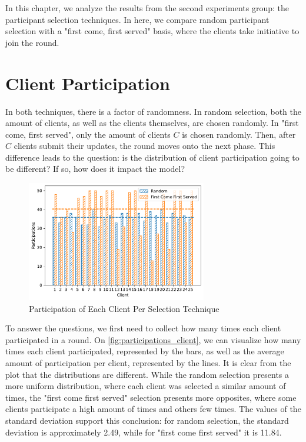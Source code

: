 In this chapter, we analyze the results from the second experiments group: the participant selection techniques. In here, we compare random participant selection with a "first come, first served" basis, where the clients take initiative to join the round.

\section{Client Participation}

In both techniques, there is a factor of randomness. In random selection, both the amount of clients, as well as the clients themselves, are chosen randomly. In "first come, first served", only the amount of clients $C$ is chosen randomly. Then, after $C$ clients submit their updates, the round moves onto the next phase. This difference leads to the question: is the distribution of client participation going to be different? If so, how does it impact the model?

\begin{figure}[!ht]
    \centering
    \centering
    \includegraphics[width=0.7\textwidth]{graphics/selection/clients.pdf}
    \caption{Participation of Each Client Per Selection Technique}
    \label{fig:participations_client}
\end{figure}

To answer the questions, we first need to collect how many times each client participated in a round. On \autoref{fig:participations_client}, we can visualize how many times each client participated, represented by the bars, as well as the average amount of participation per client, represented by the lines. It is clear from the plot that the distributions are different. While the random selection presents a more uniform distribution, where each client was selected a similar amount of times, the "first come first served" selection presents more opposites, where some clients participate a high amount of times and others few times. The values of the standard deviation support this conclusion: for random selection, the standard deviation is approximately 2.49, while for "first come first served" it is 11.84.

